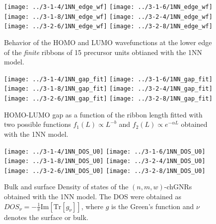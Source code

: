 \documentclass[amsmath,%
amssymb,prb,superscriptaddress]{revtex4}
\begin{document}
\begin{figure*}
	\texttt{[image: ../3-1-4/1NN\_edge\_wf]}
	\texttt{[image: ../3-1-6/1NN\_edge\_wf]}
	\texttt{[image: ../3-1-8/1NN\_edge\_wf]}
	\texttt{[image: ../3-2-4/1NN\_edge\_wf]}
	\texttt{[image: ../3-2-6/1NN\_edge\_wf]}
	\texttt{[image: ../3-2-8/1NN\_edge\_wf]}
	\caption{Behavior of the HOMO and LUMO wavefunctions at the lower edge of the \emph{finite} ribbons of 15 precursor units obtianed with the 1NN model.}
\end{figure*}

\begin{figure*}
	\texttt{[image: ../3-1-4/1NN\_gap\_fit]}
	\texttt{[image: ../3-1-6/1NN\_gap\_fit]}
	\texttt{[image: ../3-1-8/1NN\_gap\_fit]}
	\texttt{[image: ../3-2-4/1NN\_gap\_fit]}
	\texttt{[image: ../3-2-6/1NN\_gap\_fit]}
	\texttt{[image: ../3-2-8/1NN\_gap\_fit]}	
	\caption{HOMO-LUMO gap as a function of the ribbon length fitted with two possible functions $f_{1}(L) \propto L^{-b}$ and $f_{2}(L) \propto e^{-\alpha L}$ obtained with the 1NN model.}	
	\label{fig:gap-fit-length}		
\end{figure*}

\begin{figure*}
	\texttt{[image: ../3-1-4/1NN\_DOS\_U0]}
	\texttt{[image: ../3-1-6/1NN\_DOS\_U0]}
	\texttt{[image: ../3-1-8/1NN\_DOS\_U0]}
	\texttt{[image: ../3-2-4/1NN\_DOS\_U0]}
	\texttt{[image: ../3-2-6/1NN\_DOS\_U0]}
	\texttt{[image: ../3-2-8/1NN\_DOS\_U0]}
	\caption{Bulk and surface Density of states of the $(n,m,w)$-chGNRs obtained with the 1NN model. The DOS were obtained as $DOS_{\nu}=-\frac{1}{\pi}\mathrm{Im}\left[\mathrm{Tr}\left[ g_{\nu} \right]\right]$, where $g$ is the Green's function and $\nu$ denotes the surface or bulk.}		
\end{figure*}
\end{document}
